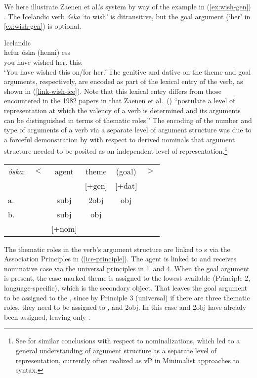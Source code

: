 \documentclass[output=paper,hidelinks]{langscibook}
\begin{document}
We here illustrate Zaenen et al.'s system by way of the  example in
(\ref{ex:wish-gen}) \citep[470]{ZMT85:Case}.  The Icelandic verb {\em
  \'{o}ska} `to wish' is ditransitive, but the goal argument (`her' in
\ref{ex:wish-gen}) is optional.  

\ea \label{ex:wish-gen} Icelandic \\
 {hefur}  {\'{o}ska{\dh}} {(henni)} {{\textthorn}ess} \\
{you} {have} {wished}  {her.\DAT} {this.\GEN} \\
\glt `You have wished this on/for her.' 
\z 
The genitive and dative on the theme and goal arguments, respectively, are encoded as part of
the lexical entry of the verb, as shown in (\ref{link-wish-ice}).  Note that
this lexical entry differs from those encountered in the 1982 papers in that
Zaenen et al.~(\citeyear[465]{ZMT85:Case}) ``postulate a level of representation
at which the valency of a verb is determined and its arguments can be
distinguished in terms of thematic roles.''  The encoding of the number and type
of arguments of a verb via a separate level of argument structure was due to a  forceful demonstration by \citet{Rappaport83} with
respect to derived nominals that argument structure needed to be posited as an
independent 
level of representation.\footnote{See \citet{chomsky1970remarks} for similar
  conclusions with respect to nominalizations, which led to a general understanding of argument structure as a separate level of
representation, currently often realized as vP in Minimalist approaches to syntax.}

\ea \label{link-wish-ice}
\begin{tabular}[t]{lc@{}ccc@{}c}
{\em \'{o}ska}: & $<$ & agent & theme & (goal) & $>$ \\
&&& [+gen] & [+dat] \\
a. && {\sc subj} & {\sc 2obj} & {\sc obj} \\
b. && {\sc subj} & {\sc obj} \\
&& [+nom] \\
\end{tabular}
\z
The thematic roles in the verb's argument structure are linked to {\GF}s via
the Association Principles in (\ref{ice-principle}).  The agent is linked to
\SUBJ and receives nominative case via the universal principles in 1~and 4. 
When the goal argument is present, the case marked theme is assigned to the
lowest available {\GF} (Principle 2, language-specific), which is the secondary
object. That leaves the goal argument to be assigned to the \OBJ, since by
Principle 3 (universal) if there are three thematic roles, they need to be
assigned to \SUBJ, \OBJ and {\sc 2obj}.  In this case  \SUBJ and {\sc 2obj} have already
been assigned, leaving only \OBJ. 
\end{document}
